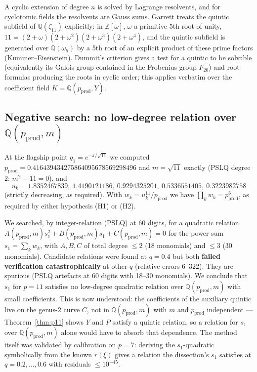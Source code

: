 \documentclass[11pt]{amsart}
\theoremstyle{plain}
\theoremstyle{definition}
\theoremstyle{remark}
\newcommand{\Z}{\mathbb{Z}}
\newcommand{\Q}{\mathbb{Q}}
\newcommand{\pprod}{p_{\mathrm{prod}}}
\begin{document}
A cyclic extension of degree $n$ is solved by Lagrange resolvents, and for
cyclotomic fields the resolvents are Gauss sums. Garrett \cite{Garrett10} treats the
quintic subfield of $\Q(\zeta_{11})$ explicitly: in $\Z[\omega]$, $\omega$ a
primitive 5th root of unity, $11 = (2+\omega)(2+\omega^2)(2+\omega^3)(2+\omega^4)$,
and the quintic subfield is generated over $\Q(\omega_5)$ by a 5th root of an
explicit product of these prime factors (Kummer--Eisenstein). Dummit's criterion
\cite{Dummit91} gives a test for a quintic to be solvable (equivalently its Galois
group contained in the Frobenius group $F_{20}$) and root formulas producing the
roots in cyclic order; this applies verbatim over the coefficient field
$K = \Q(\pprod, Y)$.

\subsection{Negative search: no low-degree relation over $\Q(\pprod,m)$}

At the flagship point $q_1 = e^{-\pi/\sqrt{11}}$ we computed
$\pprod = 0.416439434275864095678569298496$ and $m = \sqrt{11}$ exactly
(PSLQ degree $2$: $m^2 - 11 = 0$), and
\begin{equation}
u_k = 1.8352467839,\ 1.4190121186,\ 0.9294325201,\ 0.5336551405,\ 0.3223982758
\end{equation}
(strictly decreasing, as required).
With $w_k = u_k^{11}/\pprod$ we have $\prod_k w_k = \pprod^6$, as required by
either hypothesis (H1) or (H2).

We searched, by integer-relation (PSLQ) at 60 digits, for a quadratic relation
$A(\pprod,m)s_1^2 + B(\pprod,m)s_1 + C(\pprod,m) = 0$ for the power sum
$s_1 = \sum_k w_k$, with $A,B,C$ of total degree $\leq 2$ (18 monomials) and
$\leq 3$ (30 monomials). Candidate relations were found at $q=0.4$ but both
\textbf{failed verification catastrophically} at other $q$ (relative errors $6$--$322$).
They are spurious (PSLQ artefacts at 60 digits with 18--30 monomials). We conclude
that $s_1$ for $p=11$ satisfies no low-degree quadratic relation over $\Q(\pprod,m)$
with small coefficients. This is now understood: the coefficients of the auxiliary
quintic live on the genus-$2$ curve $C$, not in $\Q(\pprod,m)$ with $m$ and $\pprod$
independent --- Theorem~\ref{thm:p11} shows $Y$ and $P$ satisfy a quintic relation,
so a relation for $s_1$ over $\Q(\pprod,m)$ alone would have to absorb that
dependence. The method itself was validated by calibration on $p=7$: deriving the
$s_1$-quadratic symbolically from the known $r(\xi)$ gives a relation the
dissection's $s_1$ satisfies at $q = 0.2,\dots,0.6$ with residuals
$\leq 10^{-45}$.
\end{document}
